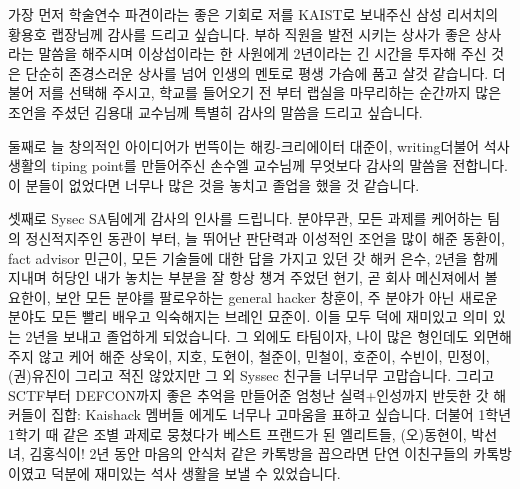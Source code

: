 \documentclass[master,english,final,pdfdoc]{kaist-ucs-improved}
\begin{document}
		
		
		
		
		
		
		
		




{\footnotesize
	
}


\iffinal
	\acknowledgment[4]
	가장 먼저 학술연수 파견이라는 좋은 기회로 저를 KAIST로 보내주신 삼성 리서치의 황용호 랩장님께 감사를 드리고 싶습니다. 부하 직원을 발전 시키는 상사가 좋은 상사라는 말씀을 해주시며 이상섭이라는 한 사원에게 2년이라는 긴 시간을 투자해 주신 것은 단순히 존경스러운 상사를 넘어 인생의 멘토로 평생 가슴에 품고 살것 같습니다. 
	더불어 저를 선택해 주시고, 학교를 들어오기 전 부터 랩실을 마무리하는 순간까지 많은 조언을 주셨던 김용대 교수님께 특별히 감사의 말씀을 드리고 싶습니다. 
	
	둘째로 늘 창의적인 아이디어가 번뜩이는 해킹-크리에이터 대준이, writing더불어 석사 생활의 tiping point를 만들어주신 손수엘 교수님께 무엇보다 감사의 말씀을 전합니다. 이 분들이 없었다면 너무나 많은 것을 놓치고 졸업을 했을 것 같습니다. 

	셋째로 Sysec SA팀에게 감사의 인사를 드립니다. 분야무관, 모든 과제를 케어하는 팀의 정신적지주인 동관이 부터, 늘 뛰어난 판단력과 이성적인 조언을 많이 해준 동환이, fact advisor 민근이, 모든 기술들에 대한 답을 가지고 있던 갓 해커 은수, 2년을 함께 지내며 허당인 내가 놓치는 부분을 잘 항상 챙겨 주었던 현기, 곧 회사 메신져에서 볼 요한이, 보안 모든 분야를 팔로우하는 general hacker 창훈이, 주 분야가 아닌 새로운 분야도 모든 빨리 배우고 익숙해지는 브레인 묘준이. 이들 모두 덕에 재미있고 의미 있는 2년을 보내고 졸업하게 되었습니다. 
	그 외에도 타팀이자, 나이 많은 형인데도 외면해 주지 않고 케어 해준 상욱이, 지호, 도현이, 철준이, 민철이, 호준이, 수빈이, 민정이, (권)유진이 그리고 적진 않았지만 그 외 Syssec 친구들 너무너무 고맙습니다.
	그리고 SCTF부터 DEFCON까지 좋은 추억을 만들어준 엄청난 실력+인성까지 반듯한 갓 해커들이 집합: Kaishack 멤버들 에게도 너무나 고마움을 표하고 싶습니다.
	더불어 1학년 1학기 때 같은 조별 과제로 뭉쳤다가 베스트 프랜드가 된 엘리트들, (오)동현이, 박선녀, 김홍식이! 2년 동안 마음의 안식처 같은 카톡방을 꼽으라면 단연 이친구들의 카톡방이였고 덕분에 재미있는 석사 생활을 보낼 수 있었습니다.
\end{document}
